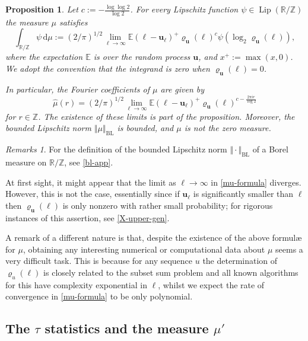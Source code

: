 \documentclass[11pt,reqno]{amsart}
\numberwithin{equation}{section}
\newtheorem{proposition}[theorem]{Proposition}
\theoremstyle{definition}
\theoremstyle{remark}
\newtheorem*{remarks}{Remarks}
\newcommand{\mb}{\mathbb}
\newcommand{\mbf}{\mathbf}
\newcommand{\wh}{\widehat}
\def\BL{\operatorname{BL}}
\newcommand\Z{\mathbb{Z}}
\newcommand\R{\mathbb{R}}
\newcommand\Lip{\operatorname{Lip}}
\begin{document}
\begin{proposition}\label{prop16.2}
Let $c := -\frac{\log \log 2}{\log 2}$. For every Lipschitz function $\psi \in \Lip(\R/\Z)$ the measure $\mu$ satisfies 
\begin{equation}\label{mu-formula} \int_{\R/\Z} \psi \, \mathrm{d}\mu := (2/\pi)^{1/2}\lim_{\ell \rightarrow \infty}\mb{E}(\ell - \mbf{u}_{\ell})^+ \varrho_{\mbf{u}}(\ell)^c \psi (\log_2 \varrho_{\mbf{u}}(\ell)) ,\end{equation} where the expectation $\mb{E}$ is over the random process $\mbf{u}$, and $x^+ := \max(x, 0)$. We adopt the convention that the integrand is zero when $\varrho_{\mbf{u}}(\ell) = 0$.

In particular, the Fourier coefficients of $\mu$ are given by
\[ \wh{\mu}(r) =  (2/\pi)^{1/2}\lim_{\ell \rightarrow \infty}\mb{E}(\ell - \mbf{u}_{\ell})^+\varrho_{\mbf{u}}(\ell)^{c - \frac{2\pi i r}{\log 2}}\] for $r \in \Z$.
The existence of these limits is part of the proposition. Moreover, the bounded Lipschitz norm $\Vert \mu \Vert_{\BL}$ is bounded, and $\mu$ is not the zero measure.
\end{proposition}
\begin{remarks} For the definition of the bounded Lipschitz norm $\Vert \cdot \Vert_{\BL}$ of a Borel measure on $\R/\Z$, see \cref{bl-app}.

At first sight, it might appear that the limit as $\ell \rightarrow \infty$ in \cref{mu-formula} diverges. However, this is not the case, essentially since if $\mbf{u}_{\ell}$ is significantly smaller than $\ell$ then $\varrho_{\mbf{u}}(\ell)$ is only nonzero with rather small probability; for rigorous instances of this assertion, see \cref{X-upper-gen}.

A remark of a different nature is that, despite the existence of the above formul{\ae} for $\mu$, obtaining any interesting numerical or computational data about $\mu$ seems a very difficult task. This is because for any sequence $u$ the determination of $\varrho_{u}(\ell)$ is closely related to the subset sum problem and all known algorithms for this have complexity exponential in $\ell$, whilst we expect the rate of convergence in \cref{mu-formula} to be only polynomial.
\end{remarks}


\subsection{The $\tau$ statistics and the measure $\mu'$}\label{tau-stat-intro}
\end{document}

